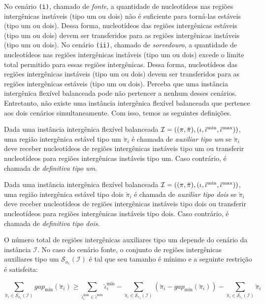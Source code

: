 No cenário \texttt{(i)}, chamado de \emph{fonte}, a quantidade de nucleotídeos nas regiões intergênicas instáveis (tipo um ou dois) não é suficiente para torná-las estáveis (tipo um ou dois). Dessa forma, nucleotídeos das regiões intergênicas estáveis (tipo um ou dois) devem ser transferidos para as regiões intergênicas instáveis (tipo um ou dois). No cenário \texttt{(ii)}, chamado de \emph{sorvedouro}, a quantidade de nucleotídeos nas regiões intergênicas instáveis (tipo um ou dois) excede o limite total permitido para essas regiões intergênicas. Dessa forma, nucleotídeos das regiões intergênicas instáveis (tipo um ou dois) devem ser transferidos para as regiões intergênicas estáveis (tipo um ou dois). Perceba que uma instância intergênica flexível balanceada pode não pertencer a nenhum desses cenários. Entretanto, não existe uma instância intergênica flexível balanceada que pertence aos dois cenários simultaneamente. Com isso, temos as seguintes definições.

\begin{definition}
  Dada uma instância intergênica flexível balanceada $\mathcal{I} = ((\pi,\breve\pi),(\iota,\breve\iota^{\min},\break\breve\iota^{\max}))$, uma região intergênica estável tipo um $\breve\pi_i$ é chamada de \emph{auxiliar tipo um} se $\breve\pi_i$ deve receber nucleotídeos de regiões intergênicas instáveis tipo um ou transferir nucleotídeos para regiões intergênicas instáveis tipo um. Caso contrário, é chamada de \emph{definitiva tipo um}.
\end{definition}

\begin{definition}
  Dada uma instância intergênica flexível balanceada $\mathcal{I} = ((\pi,\breve\pi),(\iota,\breve\iota^{\min},\break\breve\iota^{\max}))$, uma região intergênica estável tipo dois $\breve\pi_i$ é chamada de \emph{auxiliar tipo dois} se $\breve\pi_i$ deve receber nucleotídeos de regiões intergênicas instáveis tipo dois ou transferir nucleotídeos para regiões intergênicas instáveis tipo dois. Caso contrário, é chamada de \emph{definitiva tipo dois}.
\end{definition}

O número total de regiões intergênicas auxiliares tipo um depende do cenário da instância $\mathcal{I}$. No caso do cenário fonte, o conjunto de regiões intergênicas auxiliares tipo um $\mathcal{S}_{a_{1}}(\mathcal{I})$ é tal que seu tamanho é mínimo e a seguinte restrição é satisfeita:

$$\sum_{\breve\pi_i \in \mathcal{S}_{a_{1}}(\mathcal{I})} gap_{\min}(\breve\pi_i) \ge \sum_{\breve\iota_{i}^{\min}  \in \breve\iota^{\min}} \breve\iota_{i}^{\min} - \sum_{\breve\pi_i \in \mathcal{S}_{e_{1}}(\mathcal{I})} (\breve\pi_i - gap_{\min}(\breve\pi_i)) - \sum_{\breve\pi_i \in \mathcal{S}_{i_{1}}(\mathcal{I})} \breve\pi_i$$

